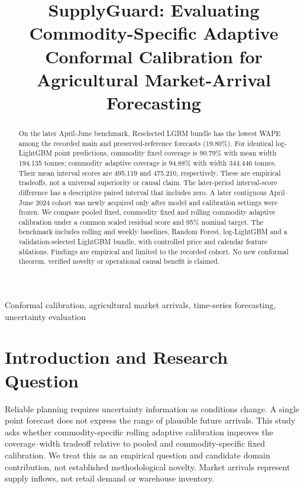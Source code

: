 \documentclass[conference]{IEEEtran}
\title{SupplyGuard: Evaluating Commodity-Specific Adaptive Conformal Calibration for Agricultural Market-Arrival Forecasting}
\author{\IEEEauthorblockN{M.Tech Research Project}\IEEEauthorblockA{Rough draft for staff review; author and affiliation to be completed}}
\begin{document}
\maketitle
\begin{abstract}
On the later April-June benchmark, Reselected LGBM bundle has the lowest WAPE among the recorded main and preserved-reference forecasts (19.80\%). For identical log-LightGBM point predictions, commodity fixed coverage is 90.79\% with mean width 194.135 tonnes; commodity adaptive coverage is 94.88\% with width 344.446 tonnes. Their mean interval scores are 495.119 and 475.210, respectively. These are empirical tradeoffs, not a universal superiority or causal claim. The later-period interval-score difference has a descriptive paired interval that includes zero. A later contiguous April--June 2024 cohort was newly acquired only after model and calibration settings were frozen. We compare pooled fixed, commodity fixed and rolling commodity adaptive calibration under a common scaled residual score and 95\% nominal target. The benchmark includes rolling and weekly baselines, Random Forest, log-LightGBM and a validation-selected LightGBM bundle, with controlled price and calendar feature ablations. Findings are empirical and limited to the recorded cohort. No new conformal theorem, verified novelty or operational causal benefit is claimed.
\end{abstract}
\begin{IEEEkeywords}Conformal calibration, agricultural market arrivals, time-series forecasting, uncertainty evaluation\end{IEEEkeywords}
\section{Introduction and Research Question}
Reliable planning requires uncertainty information as conditions change. A single point forecast does not express the range of plausible future arrivals. This study asks whether commodity-specific rolling adaptive calibration improves the coverage--width tradeoff relative to pooled and commodity-specific fixed calibration. We treat this as an empirical question and candidate domain contribution, not established methodological novelty. Market arrivals represent supply inflows, not retail demand or warehouse inventory.
\end{document}
